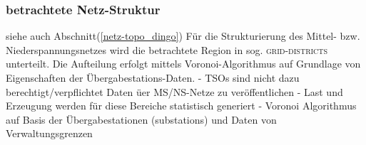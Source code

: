 \documentclass[
a4paper,     %
12pt         %
]{scrartcl}  %
\begin{document}
\subsubsection{betrachtete Netz-Struktur}
siehe auch Abschnitt(\ref{netz-topo_dingo})
Für die Strukturierung des Mittel- bzw. Niederspannungsnetzes wird die betrachtete Region in sog. \textsc{grid-districts} unterteilt. Die Aufteilung erfolgt mittels Voronoi-Algorithmus auf Grundlage von Eigenschaften der Übergabestations-Daten.
- TSOs sind nicht dazu berechtigt/verpflichtet Daten üer MS/NS-Netze zu veröffentlichen
- Last und Erzeugung werden für diese Bereiche statistisch generiert
- Voronoi Algorithmus auf Basis der Übergabestationen (substations) und Daten von Verwaltungsgrenzen

%
\end{document}
